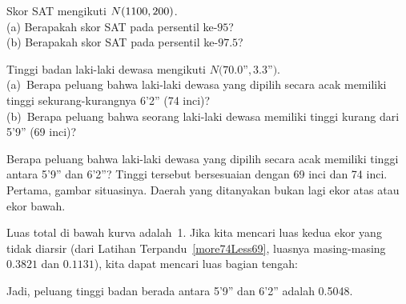 \begin{exercisewrap}
\begin{nexercise}
Skor SAT mengikuti $N(1100{}, 200{})$.\footnotemark{} \\
(a) Berapakah skor SAT pada persentil ke-$95$? \\
(b) Berapakah skor SAT pada persentil ke-$97.5$?
\end{nexercise}
\end{exercisewrap}

\D{\newpage}

\begin{exercisewrap}
\begin{nexercise}\label{more74Less69}
Tinggi badan laki-laki dewasa mengikuti $N(70.0$''$, 3.3$''$)$.\footnotemark{} \\
(a)~Berapa peluang bahwa laki-laki dewasa yang dipilih secara acak
    memiliki tinggi sekurang-kurangnya 6'2'' (74 inci)? \\
(b)~Berapa peluang bahwa seorang laki-laki dewasa memiliki tinggi
    kurang dari 5'9'' (69 inci)?
\end{nexercise}
\end{exercisewrap}

\begin{examplewrap}
\begin{nexample}{Berapa peluang bahwa laki-laki dewasa yang dipilih
    secara acak memiliki tinggi antara 5'9'' dan 6'2''?}
  Tinggi tersebut bersesuaian dengan 69 inci dan 74 inci.
  Pertama, gambar situasinya.
  Daerah yang ditanyakan bukan lagi ekor atas atau ekor bawah.\vspace{-2mm}
  \begin{center}
  \vspace{-2mm}
  \end{center}
  Luas total di bawah kurva adalah~1.
  Jika kita mencari luas kedua ekor yang tidak diarsir
  (dari Latihan Terpandu~\ref{more74Less69}, luasnya masing-masing
  $0.3821$ dan $0.1131$), kita dapat mencari luas bagian tengah:
  \vspace{-2mm}
  \begin{center}
  \vspace{-2mm}
  \end{center}
  Jadi, peluang tinggi badan berada antara 5'9'' dan 6'2''
  adalah 0.5048.
\end{nexample}
\end{examplewrap}

